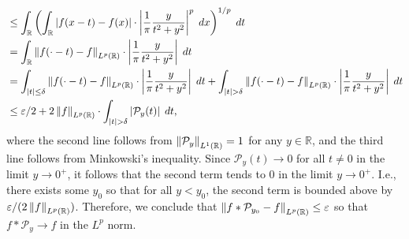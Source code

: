 \documentclass{article}
\begin{document}
\begin{enumerate}[itemsep =-2pt,label = (\alph{*})]
\begin{align*}
\begin{split}
			&\leq \int_{\mathbb{R}}\left(\int_{\mathbb{R}}|f(x - t) - f(x)| \cdot \left| \frac{1}{\pi}\frac{y}{t^{2} + y^{2}} \right|^{p}\;dx\right)^{1/p}\;dt \\
			&= \int_{\mathbb{R}}\left\Vert f(\cdot -t) - f \right\Vert_{L^{p}(\mathbb{R})} \cdot \left| \frac{1}{\pi}\frac{y}{t^{2} + y^{2}} \right|\;dt  \\
			&= \int_{|t| \leq \delta} \left\Vert f(\cdot -t) - f \right\Vert_{L^{p}(\mathbb{R})} \cdot \left| \frac{1}{\pi}\frac{y}{t^{2} + y^{2}} \right|\;dt + \int_{|t| > \delta}\left\Vert f(\cdot -t) - f \right\Vert_{L^{p}(\mathbb{R})} \cdot \left| \frac{1}{\pi}\frac{y}{t^{2} + y^{2}} \right|\;dt \\
			&\leq \varepsilon/2 + 2\left\Vert f \right\Vert_{L^{p}(\mathbb{R})} \cdot \int_{|t| > \delta}\left| \mathcal{P}_{y}(t) \right|\;dt, 
			\end{split} 
		\end{align*} 
	where the second line follows from $\left\Vert \mathcal{P}_{y} \right\Vert_{L^{1}(\mathbb{R})} = 1$ for any $y \in \mathbb{R}$, and the third line follows from Minkowski's inequality. Since $\mathcal{P}_{y}(t) \to 0$ for all $t \neq 0$ in the limit $y \to 0^{+}$, it follows that the second term tends to $0$ in the limit $y \to 0^{+}$. I.e., there exists some $y_{0}$ so that for all $y < y_{0}$, the second term is bounded above by $\varepsilon/(2 \left\Vert f \right\Vert_{L^{p}(\mathbb{R})})$. Therefore, we conclude that $\left\Vert f \ast \mathcal{P}_{y_{0}} - f \right\Vert_{L^{p}(\mathbb{R})} \leq \varepsilon$ so that $f \ast \mathcal{P}_{y} \to f$ in the $L^{p}$ norm. 
\end{enumerate} 
\end{document}
